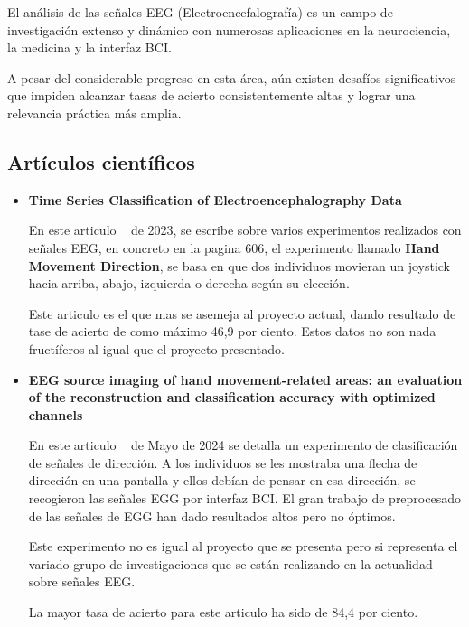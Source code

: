 

El análisis de las señales EEG (Electroencefalografía) es un campo de investigación extenso y dinámico con numerosas aplicaciones en la neurociencia, la medicina y la interfaz BCI.

A pesar del considerable progreso en esta área, aún existen desafíos significativos que impiden alcanzar tasas de acierto consistentemente altas y lograr una relevancia práctica más amplia.

\subsection{Artículos científicos}

\begin{itemize}

\item
\textbf{Time Series Classification of Electroencephalography Data}

En este articulo ~\cite{Conference:paper} de 2023, se escribe sobre varios experimentos realizados con señales EEG, en concreto en la pagina 606, el experimento llamado \textbf{Hand Movement Direction}, se basa en que dos individuos movieran un joystick hacia arriba, abajo, izquierda o derecha según su elección.

Este articulo es el que mas se asemeja al proyecto actual, dando resultado de tase de acierto de como máximo 46,9 por ciento. Estos datos no son nada fructíferos al igual que el proyecto presentado.

\item
\textbf{EEG source imaging of hand movement-related areas: an evaluation of the reconstruction and classification accuracy with optimized channels}

En este articulo ~\cite{Article:springer} de Mayo de 2024 se detalla un experimento de clasificación de señales de dirección. A los individuos se les mostraba una flecha de dirección en una pantalla y ellos debían de pensar en esa dirección, se recogieron las señales EGG por interfaz BCI. El gran trabajo de preprocesado de las señales de EGG han dado resultados altos pero no óptimos.

Este experimento no es igual al proyecto que se presenta pero si representa el variado grupo de investigaciones que se están realizando en la actualidad sobre señales EEG.

La mayor tasa de acierto para este articulo ha sido de 84,4 por ciento.


\end{itemize}


